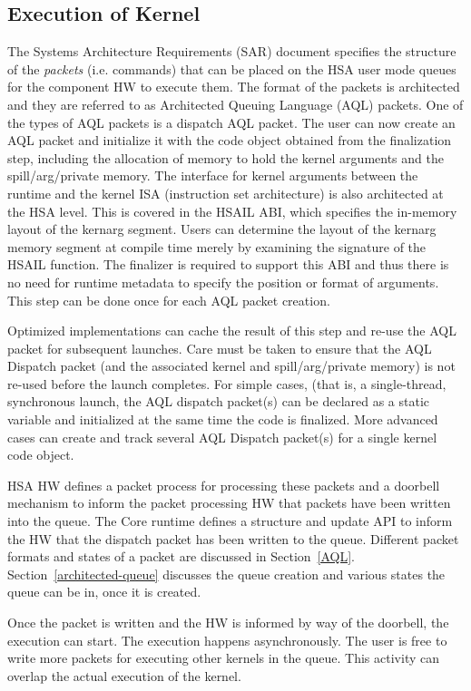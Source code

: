 \documentclass[draft]{book}
\begin{document}
\subsection{Execution of Kernel}
The Systems Architecture Requirements (SAR) document specifies the structure of
the \emph{packets} (i.e. commands) that can be placed on the HSA user mode
queues for the component HW to execute them. The format of the packets is
architected and they are referred to as Architected Queuing Language (AQL)
packets. One of the types of AQL packets is a dispatch AQL packet. The user can
now create an AQL packet and initialize it with the code object obtained from
the finalization step, including the allocation of memory to hold the kernel
arguments and the spill/arg/private memory. The interface for kernel arguments
between the runtime and the kernel ISA (instruction set architecture) is also
architected at the HSA level. This is covered in the HSAIL ABI, which specifies
the in-memory layout of the kernarg segment. Users can determine the layout of
the kernarg memory segment at compile time merely by examining the signature of
the HSAIL function. The finalizer is required to support this ABI and thus there
is no need for runtime metadata to specify the position or format of arguments.
This step can be done once for each AQL packet creation.

Optimized implementations can cache the result of this step and re-use the AQL
packet for subsequent launches. Care must be taken to ensure that the AQL
Dispatch packet (and the associated kernel and spill/arg/private memory) is not
re-used before the launch completes. For simple cases, (that is, a
single-thread, synchronous launch, the AQL dispatch packet(s) can be declared
as a static variable and initialized at the same time the code is
finalized. More advanced cases can create and track several AQL Dispatch
packet(s) for a single kernel code object.

HSA HW defines a packet process for processing these packets and a doorbell
mechanism to inform the packet processing HW that packets have been written into
the queue. The Core runtime defines a structure and update API to inform the HW
that the dispatch packet has been written to the queue. Different packet formats
and states of a packet are discussed in
Section~\ref{AQL}. Section~\ref{architected-queue} discusses the queue creation
and various states the queue can be in, once it is created.

Once the packet is written and the HW is informed by way of the doorbell, the
execution can start. The execution happens asynchronously. The user is free to
write more packets for executing other kernels in the queue. This activity can
overlap the actual execution of the kernel.
\end{document}
